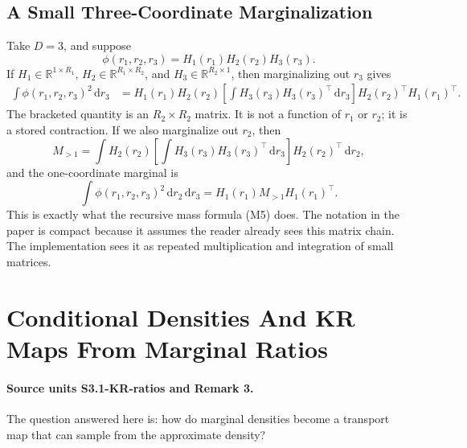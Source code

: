 \documentclass[11pt]{article}
\newcommand{\R}{\mathbb R}
\newcommand{\dd}{\,\mathrm d}
\begin{document}
\begin{center}
\end{center}

\subsection{A Small Three-Coordinate Marginalization}

Take \(D=3\), and suppose
\[
    \phi(r_1,r_2,r_3)=H_1(r_1)H_2(r_2)H_3(r_3).
\]
If \(H_1\in\R^{1\times R_1}\),
\(H_2\in\R^{R_1\times R_2}\), and
\(H_3\in\R^{R_2\times 1}\), then marginalizing out \(r_3\) gives
\[
\begin{aligned}
 \int \phi(r_1,r_2,r_3)^2\dd r_3
 &=
 H_1(r_1)H_2(r_2)
 \left[\int H_3(r_3)H_3(r_3)^\top\dd r_3\right]
 H_2(r_2)^\top H_1(r_1)^\top.
\end{aligned}
\tag{M7}
\]
The bracketed quantity is an \(R_2\times R_2\) matrix.  It is not a function of
\(r_1\) or \(r_2\); it is a stored contraction.  If we also marginalize out
\(r_2\), then
\[
    M_{>1}
    =
    \int
    H_2(r_2)
    \left[\int H_3(r_3)H_3(r_3)^\top\dd r_3\right]
    H_2(r_2)^\top
    \dd r_2,
    \tag{M8}
\]
and the one-coordinate marginal is
\[
    \int\phi(r_1,r_2,r_3)^2\dd r_2\dd r_3
    =
    H_1(r_1)M_{>1}H_1(r_1)^\top.
    \tag{M9}
\]
This is exactly what the recursive mass formula (M5) does.  The notation in the
paper is compact because it assumes the reader already sees this matrix chain.
The implementation sees it as repeated multiplication and integration of small
matrices.

\section{Conditional Densities And KR Maps From Marginal Ratios}

\paragraph{Source units S3.1-KR-ratios and Remark 3.}
The question answered here is: how do marginal densities become a transport map
that can sample from the approximate density?
\end{document}
